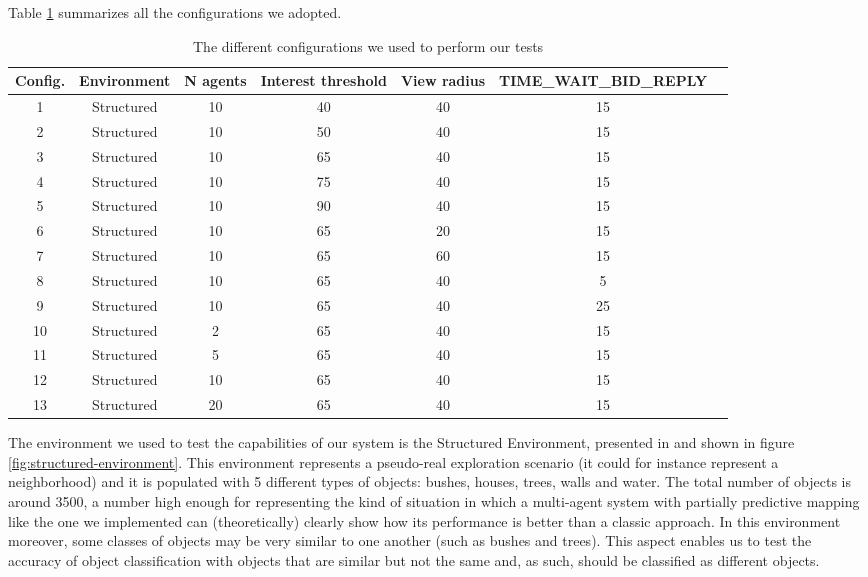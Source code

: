 \documentclass[a4paper, 10pt, conference]{ieeeconf}      %
\begin{document}
Table \ref{tab:configurations} summarizes all the configurations we adopted.
\begin{table}[htb]
    \centering
    \begin{tabular}{|c|c|c|c|c|c|c|}
        \hline
         Config. & Environment & N agents & Interest threshold & View radius & TIME\_WAIT\_BID\_REPLY \\  \hline  
         1 & Structured & 10 & 40 & 40 & 15 \\
         2 & Structured & 10 & 50 & 40 & 15 \\
         3 & Structured & 10 & 65 & 40 & 15 \\
         4 & Structured & 10 & 75 & 40 & 15 \\
         5 & Structured & 10 & 90 & 40 & 15 \\
         6 & Structured & 10 & 65 & 20 & 15 \\
         7 & Structured & 10 & 65 & 60 & 15 \\
         8 & Structured & 10 & 65 & 40 & 5 \\
         9 & Structured & 10 & 65 & 40 & 25 \\
         10 & Structured & 2 & 65 & 40 & 15 \\
         11 & Structured & 5 & 65 & 40 & 15 \\
         12 & Structured & 10 & 65 & 40 & 15 \\
         13 & Structured & 20 & 65 & 40 & 15 \\ \hline
    \end{tabular}
    \caption{The different configurations we used to perform our tests}
    \label{tab:configurations}
\end{table}

The environment we used to test the capabilities of our system is the Structured Environment, presented in \cite{tavaresgaspar} and shown in figure \ref{fig:structured-environment}. This environment represents a pseudo-real exploration scenario (it could for instance represent a neighborhood) and it is populated with 5 different types of objects: bushes, houses, trees, walls and water. The total number of objects is around 3500, a number high enough for representing the kind of situation in which a multi-agent system with partially predictive mapping like the one we implemented can (theoretically) clearly show how its performance is better than a classic approach. In this environment moreover, some classes of objects may be very similar to one another (such as bushes and trees). This aspect enables us to test the accuracy of object classification with objects that are similar but not the same and, as such, should be classified as different objects.
\end{document}
